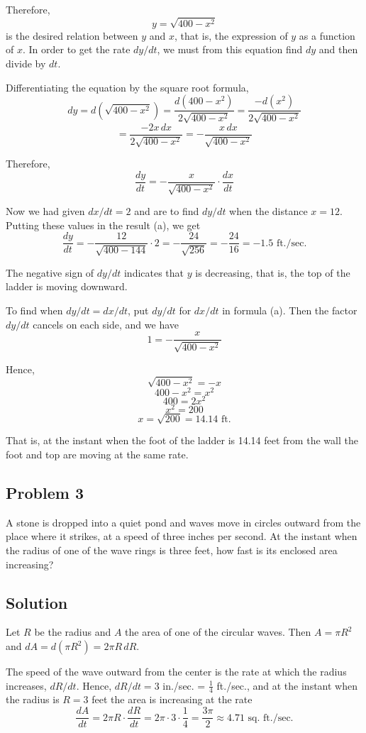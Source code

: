 Therefore,
\[y = \sqrt{400-x^2}\]
is the desired relation between $y$ and $x$, that is, the expression of $y$ as a function of $x$. In order to get the rate $dy/dt$, we must from this equation find $dy$ and then divide by $dt$.

Differentiating the equation by the square root formula,
\[dy = d(\sqrt{400-x^2}) = \frac{d(400-x^2)}{2\sqrt{400-x^2}} = \frac{-d(x^2)}{2\sqrt{400-x^2}}\]
\[= \frac{-2x\,dx}{2\sqrt{400-x^2}} = -\frac{x\,dx}{\sqrt{400-x^2}}\]

Therefore,
\[\frac{dy}{dt} = -\frac{x}{\sqrt{400-x^2}}\cdot\frac{dx}{dt} \tag{a}\]

Now we had given $dx/dt = 2$ and are to find $dy/dt$ when the distance $x = 12$. Putting these values in the result (a), we get
\[\frac{dy}{dt} = -\frac{12}{\sqrt{400-144}}\cdot 2 = -\frac{24}{\sqrt{256}} = -\frac{24}{16} = -1.5\text{ ft./sec.}\]

The negative sign of $dy/dt$ indicates that $y$ is decreasing, that is, the top of the ladder is moving downward.

To find when $dy/dt = dx/dt$, put $dy/dt$ for $dx/dt$ in formula (a). Then the factor $dy/dt$ cancels on each side, and we have
\[1 = -\frac{x}{\sqrt{400-x^2}}\]

Hence,
\[\sqrt{400-x^2} = -x\]
\[400-x^2 = x^2\]
\[400 = 2x^2\]
\[x^2 = 200\]
\[x = \sqrt{200} = 14.14\text{ ft.}\]

That is, at the instant when the foot of the ladder is 14.14 feet from the wall the foot and top are moving at the same rate.

\subsection*{Problem 3}
A stone is dropped into a quiet pond and waves move in circles outward from the place where it strikes, at a speed of three inches per second. At the instant when the radius of one of the wave rings is three feet, how fast is its enclosed area increasing?

\subsection*{Solution}
Let $R$ be the radius and $A$ the area of one of the circular waves. Then $A = \pi R^2$ and $dA = d(\pi R^2) = 2\pi R\,dR$.

The speed of the wave outward from the center is the rate at which the radius increases, $dR/dt$. Hence, $dR/dt = 3$ in./sec. = $\frac{1}{4}$ ft./sec., and at the instant when the radius is $R = 3$ feet the area is increasing at the rate
\[\frac{dA}{dt} = 2\pi R\cdot\frac{dR}{dt} = 2\pi\cdot 3\cdot\frac{1}{4} = \frac{3\pi}{2} \approx 4.71\text{ sq. ft./sec.}\]

